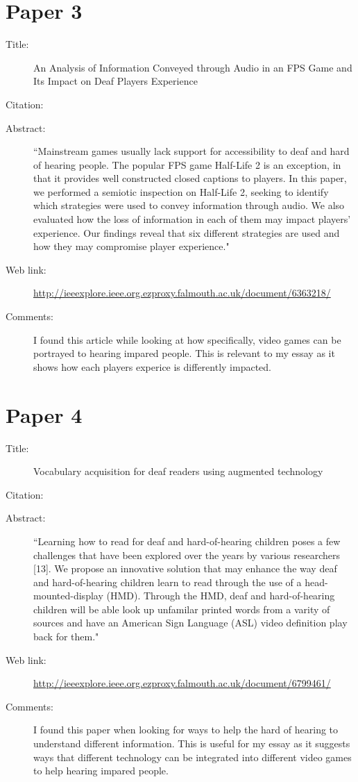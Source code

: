 \documentclass{scrartcl}
\begin{document}
\section*{Paper 3}
\begin{description}
\item[Title:] An Analysis of Information Conveyed through Audio in an FPS Game and Its Impact on Deaf Players Experience
\item[Citation:] \cite{Coutinho}
\item[Abstract:] ``Mainstream games usually lack support for accessibility to deaf and hard of hearing people. The popular FPS game Half-Life 2 is an exception, in that it provides well constructed closed captions to players. In this paper, we performed a semiotic inspection on Half-Life 2, seeking to identify which strategies were used to convey information through audio. We also evaluated how the loss of information in each of them may impact players' experience. Our findings reveal that six different strategies are used and how they may compromise player experience."
\item[Web link:] \url{http://ieeexplore.ieee.org.ezproxy.falmouth.ac.uk/document/6363218/}
\item[Comments:] I found this article while looking at how specifically, video games can be portrayed to hearing impared people. This is relevant to my essay as it shows how each players experice is differently impacted.
\end{description}

\section*{Paper 4}
\begin{description}
\item[Title:] Vocabulary acquisition for deaf readers using augmented technology
\item[Citation:] \cite{Jones}
\item[Abstract:] ``Learning how to read for deaf and hard-of-hearing children poses a few challenges that have been explored over the years by various researchers [13]. We propose an innovative solution that may enhance the way deaf and hard-of-hearing children learn to read through the use of a head-mounted-display (HMD). Through the HMD, deaf and hard-of-hearing children will be able look up unfamilar printed words from a varity of sources and have an American Sign Language (ASL) video definition play back for them."
\item[Web link:] \url{http://ieeexplore.ieee.org.ezproxy.falmouth.ac.uk/document/6799461/}
\item[Comments:] I found this paper when looking for ways to help the hard of hearing to understand different information. This is useful for my essay as it suggests ways that different technology can be integrated into different video games to help hearing impared people.
\end{description}
\end{document}
